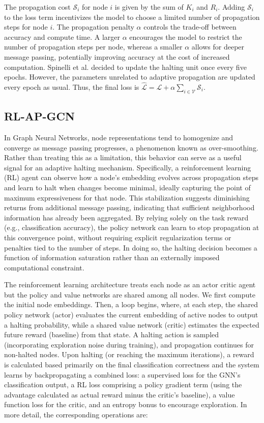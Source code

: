 \documentclass{gdl}
\begin{document}
 The propagation cost $\mathcal{S}_i$ for node $i$ is given by the sum of $K_i$ and $R_i$. Adding $\mathcal{S}_i$ to the loss term incentivizes the model to choose a limited number of propagation steps for node $i$. The propagation penalty $\alpha$ controls the trade-off between accuracy and compute time. A larger $\alpha$ encourages the model to restrict the number of propagation steps per node, whereas a smaller $\alpha$ allows for deeper message passing, potentially improving accuracy at the cost of increased computation. Spinelli et al. decided to update the halting unit once every five epochs. However, the parameters unrelated to adaptive propagation are updated every epoch as usual. Thus, the final loss is $ \mathcal{\hat{L}} = \mathcal{L} + \alpha \sum_{i\in \mathcal{V}} \mathcal{S}_i $.


\subsection{RL-AP-GCN}
In Graph Neural Networks, node representations tend to homogenize and converge as message passing progresses, a phenomenon known as over-smoothing. Rather than treating this as a limitation, this behavior can serve as a useful signal for an adaptive halting mechanism. Specifically, a reinforcement learning (RL) agent can observe how a node's embedding evolves across propagation steps and learn to halt when changes become minimal, ideally capturing the point of maximum expressiveness for that node. This stabilization suggests diminishing returns from additional message passing, indicating that sufficient neighborhood information has already been aggregated. By relying solely on the task reward (e.g., classification accuracy), the policy network can learn to stop propagation at this convergence point, without requiring explicit regularization terms or penalties tied to the number of steps. In doing so, the halting decision becomes a function of information saturation rather than an externally imposed computational constraint.

The reinforcement learning architecture treats each node as an actor critic agent but the policy and value networks are shared among all nodes. We first compute the initial node embeddings. Then, a loop begins, where, at each step, the shared policy network (actor) evaluates the current embedding of active nodes to output a halting probability, while a shared value network (critic) estimates the expected future reward (baseline) from that state. A halting action is sampled (incorporating exploration noise during training), and propagation continues for non-halted nodes. Upon halting (or reaching the maximum iterations), a reward is calculated based primarily on the final classification correctness and the system learns by backpropagating a combined loss: a supervised loss for the GNN's classification output, a RL loss comprising a policy gradient term (using the advantage calculated as actual reward minus the critic's baseline), a value function loss for the critic, and an entropy bonus to encourage exploration. In more detail, the corresponding operations are: 
\end{document}

